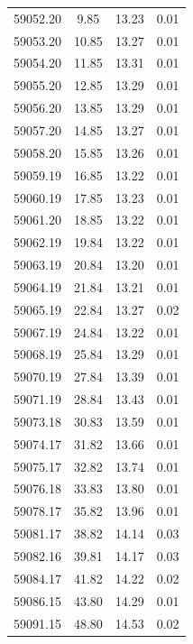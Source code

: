 \begin{longtable}{|c|c|c|c|}
 59052.20 &    9.85 &       13.23 &          0.01 \\
 59053.20 &   10.85 &       13.27 &          0.01 \\
 59054.20 &   11.85 &       13.31 &          0.01 \\
 59055.20 &   12.85 &       13.29 &          0.01 \\
 59056.20 &   13.85 &       13.29 &          0.01 \\
 59057.20 &   14.85 &       13.27 &          0.01 \\
 59058.20 &   15.85 &       13.26 &          0.01 \\
 59059.19 &   16.85 &       13.22 &          0.01 \\
 59060.19 &   17.85 &       13.23 &          0.01 \\
 59061.20 &   18.85 &       13.22 &          0.01 \\
 59062.19 &   19.84 &       13.22 &          0.01 \\
 59063.19 &   20.84 &       13.20 &          0.01 \\
 59064.19 &   21.84 &       13.21 &          0.01 \\
 59065.19 &   22.84 &       13.27 &          0.02 \\
 59067.19 &   24.84 &       13.22 &          0.01 \\
 59068.19 &   25.84 &       13.29 &          0.01 \\
 59070.19 &   27.84 &       13.39 &          0.01 \\
 59071.19 &   28.84 &       13.43 &          0.01 \\
 59073.18 &   30.83 &       13.59 &          0.01 \\
 59074.17 &   31.82 &       13.66 &          0.01 \\
 59075.17 &   32.82 &       13.74 &          0.01 \\
 59076.18 &   33.83 &       13.80 &          0.01 \\
 59078.17 &   35.82 &       13.96 &          0.01 \\
 59081.17 &   38.82 &       14.14 &          0.03 \\
 59082.16 &   39.81 &       14.17 &          0.03 \\
 59084.17 &   41.82 &       14.22 &          0.02 \\
 59086.15 &   43.80 &       14.29 &          0.01 \\
 59091.15 &   48.80 &       14.53 &          0.02 \\

\end{longtable}
